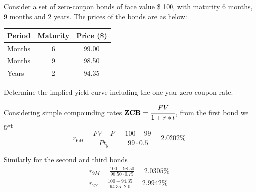 \documentclass[12pt,a4paper]{exam}
\begin{document}
\begin{questions}
  \question
  Consider a set of zero-coupon bonds of face value \$ 100, with maturity 6 months, 9 months and 2 years. The prices of the bonds are as below:
\begin{table}[h]
  \begin{center}
    \begin{tabular}{|l|c|c|}
      \hline
      \textbf{Period} & \textbf{Maturity} & \textbf{Price (\$)} \\ \hline
      Months          & 6                 & 99.00               \\ \hline
      Months          & 9                 & 98.50               \\ \hline
      Years           & 2                 & 94.35               \\ \hline
    \end{tabular}
  \end{center}
\end{table}
Determine the implied yield curve including the one year zero-coupon rate.
\fillwithlines{3cm}
\begin{solution}
Considering simple compounding rates $\textbf{ZCB}=\cfrac{FV}{1+r*t}$, from the first bond we get
\begin{equation*}
  r_{6M} = \frac{FV-P}{Pt_y} = \frac{100 - 99}{99\cdot0.5} = 2.0202\% 
\end{equation*}

Similarly for the second and third bonds
\begin{equation*}
  \begin{gathered}
    r_{9M} = \frac{100 - 98.50}{98.50\cdot0.75} = 2.0305\% \\
    r_{2Y} = \frac{100 - 94.35}{94.35\cdot2.0} = 2.9942\%
 \end{gathered}   
\end{equation*}


\end{solution}
\end{questions}
\end{document}
